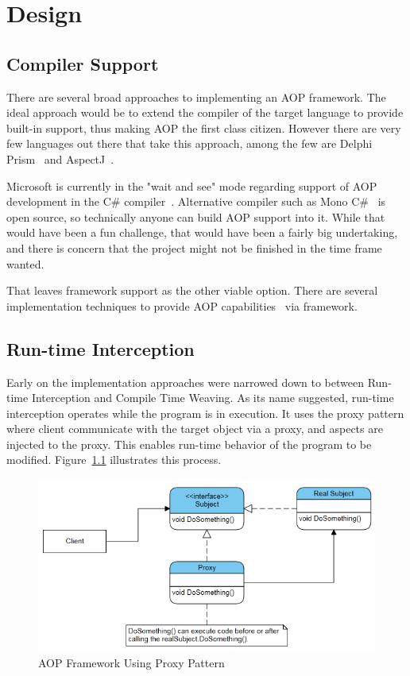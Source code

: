 \chapter{Design}

\section{Compiler Support}

There are several broad approaches to implementing an AOP framework. The ideal approach would be to extend the compiler of the target language to provide built-in support, thus making AOP the first class citizen. However there are very few languages out there that take this approach, among the few are Delphi Prism~\cite{delphi_prism2010} and AspectJ~\cite{aspectj_faq, aspectj_text}. 

Microsoft is currently in the "wait and see" mode regarding support of AOP development in the C\# compiler~\cite{hejlsberg}. Alternative compiler such as Mono C\#~\cite{monocsharp} is open source, so technically anyone can build AOP support into it. While that would have been a fun challenge, that would have been a fairly big undertaking, and there is concern that the project might not be finished in the time frame wanted.

That leaves framework support as the other viable option. There are several implementation techniques to provide AOP capabilities~\cite{aopcs, postsharp, aspectcs} via framework.

\section{Run-time Interception}

Early on the implementation approaches were narrowed down to between Run-time Interception and Compile Time Weaving. As its name suggested, run-time interception operates while the program is in execution. It uses the proxy pattern where client communicate with the target object via a proxy, and aspects are injected to the proxy. This enables run-time behavior of the program to be modified. Figure~\ref{proxy_model} illustrates this process.

\begin{figure}[H]
  \includegraphics[scale=1.0]{Proxy2.PNG}
  \centering
  \caption{AOP Framework Using Proxy Pattern\label{proxy_model}}
\end{figure}

